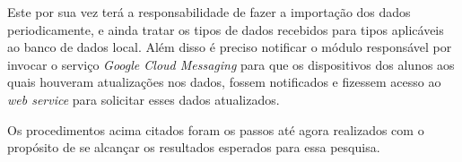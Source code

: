 	\par Este por sua vez terá a responsabilidade de fazer a importação dos dados
periodicamente, e ainda tratar os tipos de dados recebidos para tipos
aplicáveis ao banco de dados local. Além disso é preciso notificar o módulo
responsável por invocar o serviço \textit{Google Cloud Messaging} para que os
dispositivos dos alunos aos quais houveram atualizações nos dados, fossem
notificados e fizessem acesso ao \textit{web service} para solicitar esses
dados atualizados.

	\par Os procedimentos acima citados foram os passos até agora realizados com o
propósito de se alcançar os resultados esperados para essa pesquisa.



